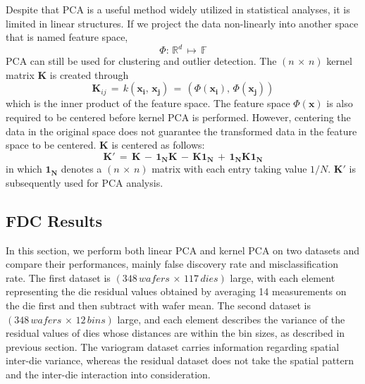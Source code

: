 \documentclass[english]{article}
\numberwithin{equation}{section}
\numberwithin{table}{section}
\numberwithin{figure}{section}
\begin{document}
Despite that PCA is a useful method widely utilized in statistical
analyses, it is limited in linear structures. If we project the data
non-linearly into another space that is named feature space, 
\begin{equation} \label{zz5}
\Phi:\,\mathbb{R}^{d}\,\longmapsto\,\mathbb{F}
\end{equation}
PCA can still be used for clustering and outlier detection. The $(n\,\times\, n)$
kernel matrix $\mathbf{K}$ is created through
\begin{equation} \label{zz6}
\mathbf{K}_{ij}\,=\, k(\mathbf{x_{i}},\,\mathbf{x_{j}})\,=\,(\Phi(\mathbf{x_{i}}),\,\Phi(\mathbf{x_{j}}))
\end{equation}
which is the inner product of the feature space. The feature space
$\Phi(\mathbf{x})$ is also required to be centered before kernel
PCA is performed. However, centering the data in the original space
does not guarantee the transformed data in the feature space to be
centered. $\mathbf{K}$ is centered as follows:
\begin{equation} \label{zz7}
\mathbf{K}'\,=\,\mathbf{K}\,-\,\mathbf{1_{N}K}\,-\,\mathbf{K1_{N}}\,+\,\mathbf{1_{N}K1_{N}}
\end{equation}
in which $\mathbf{1_{N}}$ denotes a $(n\,\times\, n)$ matrix with
each entry taking value $1/N$. $\mathbf{K}'$ is subsequently used
for PCA analysis.


\subsection{FDC Results} \label{kernres}
\hspace{12 pt}
In this section, we perform both linear PCA and kernel PCA on two
datasets and compare their performances, mainly false discovery rate
and misclassification rate. The first dataset is $(348\, wafers\,\times\,117\, dies)$
large, with each element representing the die residual values obtained
by averaging 14 measurements on the die first and then subtract with
wafer mean. The second dataset is $(348\, wafers\,\times\,12\, bins)$
large, and each element describes the variance of the residual values
of dies whose distances are within the bin sizes, as described in
previous section. The variogram dataset carries information regarding
spatial inter-die variance, whereas the residual dataset does not
take the spatial pattern and the inter-die interaction into consideration.
\end{document}
